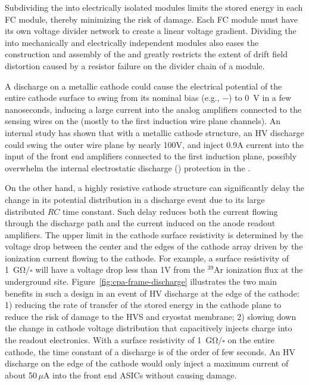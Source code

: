Subdividing the  into electrically isolated modules limits the stored energy in each FC module, thereby minimizing the risk of damage. Each FC module must have its own voltage divider network to create a linear voltage gradient. Dividing the  into mechanically and electrically independent modules also eases the construction and assembly of the  and greatly restricts the extent of drift field distortion caused by a resistor failure on the divider chain of a  module.

A  discharge on a metallic cathode could cause the electrical potential of the entire cathode surface to swing from its nominal bias (e.g., $-$\sptargetdriftvoltpos) to \SI{0}{V} in a few nanoseconds, inducing a large current into the analog  amplifiers connected to the sensing wires on the  (mostly to the first induction wire plane channels). 
An internal study\cite{bib:docdb1320} has shown that with a metallic cathode structure, an HV discharge could swing the outer wire plane by nearly 100V, and inject 0.9A current into the input of the front end amplifiers connected to the first induction plane, possibly overwhelm the internal electrostatic discharge () protection in the  .  


On the other hand, a highly resistive cathode structure can significantly delay the change in its potential distribution in a discharge event due to its large distributed $RC$ time constant. Such delay reduces both the current flowing through the discharge path and the current induced on the anode readout amplifiers.  The upper limit in the cathode surface resistivity is determined by the voltage drop between the center and the edges of the cathode array driven by the ionization current flowing to the cathode.  For example, a surface resistivity of \SI{1}{\giga\ohm}/$\square$ will have a voltage drop less than 1V from the $^{39}$Ar ionization flux at the underground site. Figure~\ref{fig:cpa-frame-discharge} illustrates the two main benefits in such a design in an event of HV discharge at the edge of the cathode: 1) reducing the rate of transfer of the stored energy in the cathode plane to reduce the risk of damage to the HVS and cryostat membrane; 2) slowing down the change in cathode voltage distribution that capacitively injects charge into the readout electronics.
With a surface resistivity of \SI{1}{\giga\ohm}/$\square$ on the entire cathode, the time constant of a discharge is of the order of few seconds. An HV discharge on the edge of the cathode would only inject a maximum current of about 50\,$\mu$A into the front end ASICs without causing damage.



